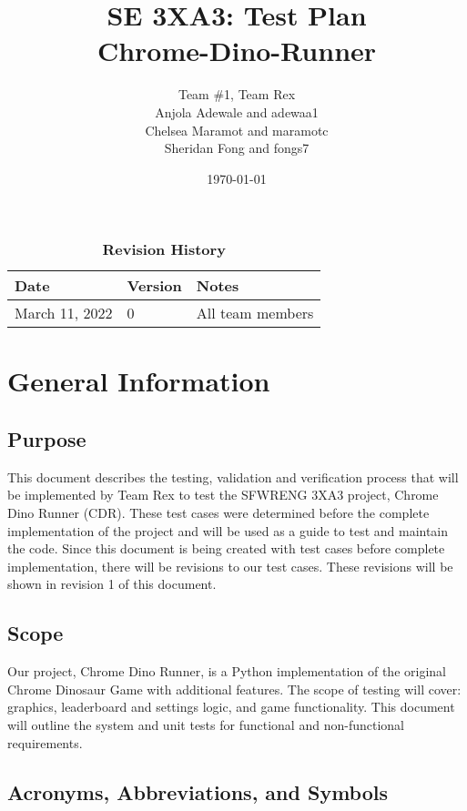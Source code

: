 \documentclass[12pt, titlepage]{article}
\title{SE 3XA3: Test Plan\\Chrome-Dino-Runner}
\author{Team \#1, Team Rex
		\\ Anjola Adewale and adewaa1
		\\ Chelsea Maramot and maramotc
		\\ Sheridan Fong and fongs7
}
\date{\today}
\begin{document}
\maketitle

\tableofcontents
\listoftables

\newpage

\begin{table}[h]
\caption{\bf Revision History}
\begin{tabularx}{\textwidth}{p{3cm}p{2cm}X}
\toprule {\bf Date} & {\bf Version} & {\bf Notes}\\
\midrule
March 11, 2022 & 0 & All team members\\
\bottomrule
\end{tabularx}
\end{table}

\newpage



\section{General Information}

\subsection{Purpose}
This document describes the testing, validation and verification process that will be implemented by Team Rex to test the SFWRENG 3XA3 project, Chrome Dino Runner (CDR). These test cases were determined before the complete implementation of the project and will be used as a guide to test and maintain the code. Since this document is being created with test cases before complete implementation, there will be revisions to our test cases. These revisions will be shown in revision 1 of this document. 

\subsection{Scope}
Our project, Chrome Dino Runner, is a Python implementation of the original Chrome Dinosaur Game with additional features. The scope of testing will cover: graphics, leaderboard and settings logic, and game functionality. This document will outline the system and unit tests for functional and non-functional requirements. 

\subsection{Acronyms, Abbreviations, and Symbols}
	
\end{document}
